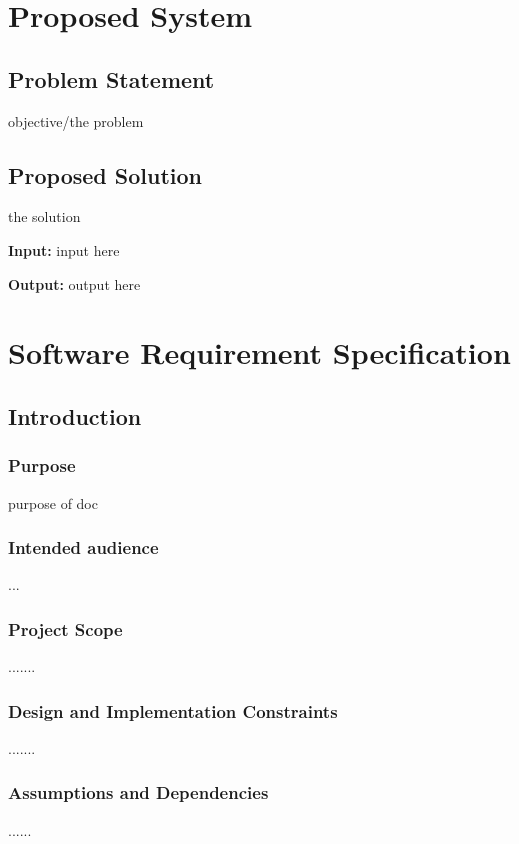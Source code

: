 \documentclass[11pt]{report}
\begin{document}
\chapter {Proposed System}
\label{ps}

\section{Problem Statement}

objective/the problem

\section{Proposed Solution}

the solution

\textbf{Input:} input here

\textbf{Output:} output here %

 
\chapter {Software Requirement Specification}
\label{srs}


\section{Introduction}
\subsection{Purpose}
purpose of doc
\subsection{Intended audience}
...
\subsection{Project Scope}
.......
\subsection{Design and Implementation Constraints}
.......
\subsection{Assumptions and Dependencies}
......
\end{document}
